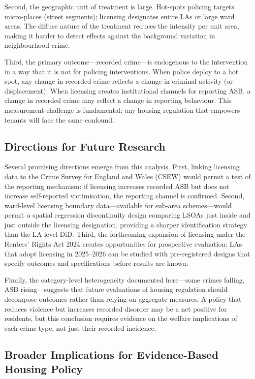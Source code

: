 \documentclass[12pt]{article}
\begin{document}
Second, the geographic unit of treatment is large. Hot-spots policing targets micro-places (street segments); licensing designates entire LAs or large ward areas. The diffuse nature of the treatment reduces the intensity per unit area, making it harder to detect effects against the background variation in neighbourhood crime.

Third, the primary outcome---recorded crime---is endogenous to the intervention in a way that it is not for policing interventions. When police deploy to a hot spot, any change in recorded crime reflects a change in criminal activity (or displacement). When licensing creates institutional channels for reporting ASB, a change in recorded crime may reflect a change in reporting behaviour. This measurement challenge is fundamental: any housing regulation that empowers tenants will face the same confound.

\subsection{Directions for Future Research}

Several promising directions emerge from this analysis. First, linking licensing data to the Crime Survey for England and Wales (CSEW) would permit a test of the reporting mechanism: if licensing increases recorded ASB but does not increase self-reported victimisation, the reporting channel is confirmed. Second, ward-level licensing boundary data---available for sub-area schemes---would permit a spatial regression discontinuity design comparing LSOAs just inside and just outside the licensing designation, providing a sharper identification strategy than the LA-level DiD. Third, the forthcoming expansion of licensing under the Renters' Rights Act 2024 creates opportunities for prospective evaluation: LAs that adopt licensing in 2025--2026 can be studied with pre-registered designs that specify outcomes and specifications before results are known.

Finally, the category-level heterogeneity documented here---some crimes falling, ASB rising---suggests that future evaluations of housing regulation should decompose outcomes rather than relying on aggregate measures. A policy that reduces violence but increases recorded disorder may be a net positive for residents, but this conclusion requires evidence on the welfare implications of each crime type, not just their recorded incidence.

\subsection{Broader Implications for Evidence-Based Housing Policy}
\end{document}

